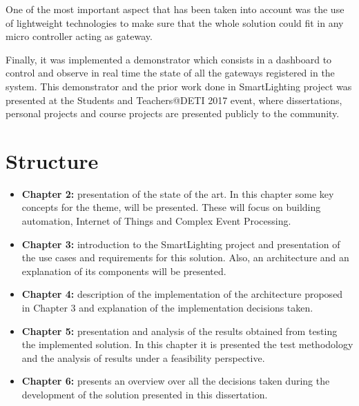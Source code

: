 One of the most important aspect that has been taken into account was the use of lightweight technologies to make sure that the whole solution could fit in any micro controller acting as gateway.

Finally, it was implemented a demonstrator which consists in a dashboard to control and observe in real time the state of all the gateways registered in the system. This demonstrator and the prior work done in SmartLighting project was presented at the Students and Teachers@DETI 2017 event, where dissertations, personal projects and course projects are presented publicly to the community.

\section{Structure}

\begin{itemize}

	\item{\textbf{Chapter 2:} presentation of the state of the art. In this chapter some key concepts
		for the theme, will be presented. These will focus on building automation, Internet of Things and Complex Event Processing.}
	\item{\textbf{Chapter 3:} introduction to the SmartLighting project and presentation of the use cases and requirements for this solution. Also, an architecture and an explanation of its components will be presented.}
	\item{\textbf{Chapter 4:} description of the implementation of the architecture proposed in Chapter 3 and explanation of the implementation decisions taken.}
	\item{\textbf{Chapter 5:} presentation and analysis of the results obtained from testing the
		implemented solution. In this chapter it is presented the test methodology and the analysis of results under a feasibility perspective.}
	\item{\textbf{Chapter 6:} presents an overview over all the decisions taken during the development of the solution presented in this dissertation.}

\end{itemize}
